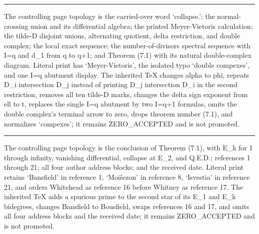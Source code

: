 \documentclass[
  english,
  a3paper,
  a3paper]{extarticle}
\begin{document}

\par

\vspace{0.7mm}\hrule\vspace{1.6mm}

\fontsize{11}{14}\selectfont

The controlling page topology is the carried-over word `collapse.'; the
normal-crossing union and its differential algebra; the printed
Meyer-Vietoris calculation; the tilde-D disjoint unions, alternating
quotient, delta restriction, and double complex; the local exact
sequence; the number-of-divisors spectral sequence with
\textbar I\textbar=q and d\_1 from q to q+1; and Theorem (7.1) with its
natural double-complex diagram. Literal print has `Meyer-Vietoris', the
isolated typo `double compexes', and one \textbar I\textbar=q abutment
display. The inherited TeX changes alpha to phi, repeats D\_i
intersection D\_j instead of printing D\_j intersection D\_i in the
second restriction, removes all ten tilde-D marks, changes the delta
sign exponent from ell to t, replaces the single \textbar I\textbar=q
abutment by two \textbar I\textbar=q+1 formulas, omits the double
complex's terminal arrow to zero, drops theorem number (7.1), and
normalizes `compexes'; it remains ZERO\_ACCEPTED and is not promoted.

\clearpage



\par

\vspace{0.7mm}\hrule\vspace{1.6mm}

\fontsize{11}{14}\selectfont

The controlling page topology is the conclusion of Theorem (7.1), with
E\_k for 1 through infinity, vanishing differential, collapse at E\_2,
and Q.E.D.; references 1 through 21; all four author address blocks; and
the received date. Literal print retains `Bansfield' in reference 1,
`Moišezon' in reference 8, `Isvestia' in reference 21, and orders
Whitehead as reference 16 before Whitney as reference 17. The inherited
TeX adds a spurious prime to the second star of its E\_1 and E\_k
bidegrees, changes Bansfield to Bousfield, swaps references 16 and 17,
and omits all four address blocks and the received date; it remains
ZERO\_ACCEPTED and is not promoted.
\end{document}
